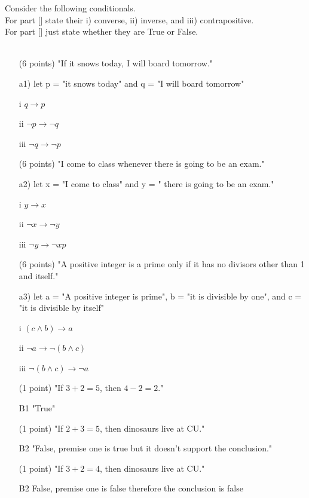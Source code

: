 \documentclass[9pt]{article}
\begin{document}
\item Consider the following conditionals.\\
\phantom{xx}For part [\color{red}{A}\color{black}] state their i) converse, ii) inverse, and iii) contrapositive.\\
\phantom{xx}For part [\color{teal}{B}\color{black}] just state whether they are True or False.\\
\\
\begin{enumerate}
\item[\color{red}{A1}] (6 points) "If it snows today, I will board tomorrow." \\
\item [{a1)}] let p = "it snows today" and q = "I will board tomorrow"
\item[{i}] $q  \to p$ 
\item[{ii}]$ \lnot p \to \lnot q$
\item[{iii}]$\lnot q \to \lnot p$ 
\item[\color{red}{A2}] (6 points) "I come to class whenever there is going to be an exam."\\
\item[{a2)}] let x = "I come to class" and y = " there is going to be an exam."
\item[{i}] $y  \to x$ 
\item[{ii}]$ \lnot x \to \lnot y$
\item[{iii}]$\lnot y \to \lnot x p$ 

\item[\color{red}{A3}] (6 points) "A positive integer is a prime only if it has no divisors other than 1 and itself."\\
\item[{a3)}] let a = "A positive integer is prime", b = "it is divisible by one", and c = "it is divisible by itself"
\item[{i}] $(c \wedge b)  \to a$ 
\item[{ii}]$ \lnot a \to \lnot(b \wedge c)$
\item[{iii}]$\lnot (b \wedge c) \to \lnot a$ 
\end{enumerate}
\begin{enumerate}
\item[\color{teal}{B1}] (1 point) "If $3+2=5$, then $4-2=2$."\\

\item[{B1}] "True"\\

\item[\color{teal}{B2}] (1 point) "If $2+3=5$, then dinosaurs live at CU."\\

\item[{B2}] "False, premise one is true but it doesn't support the conclusion."\\

\item[\color{teal}{B3}] (1 point) "If $3+2=4$, then dinosaurs live at CU."\\ 

\item[{B2}] False, premise one is false therefore the conclusion is false
\end{enumerate}
\end{document}
